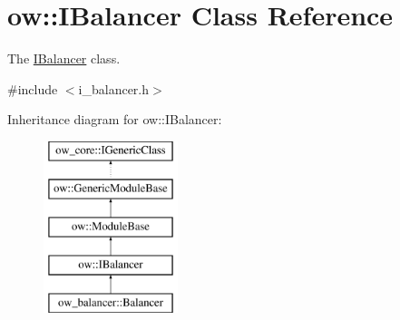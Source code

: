\hypertarget{classow_1_1IBalancer}{}\section{ow\+:\+:I\+Balancer Class Reference}
\label{classow_1_1IBalancer}


The \hyperlink{classow_1_1IBalancer}{I\+Balancer} class.  




{\ttfamily \#include $<$i\+\_\+balancer.\+h$>$}

Inheritance diagram for ow\+:\+:I\+Balancer\+:\begin{figure}[H]
\begin{center}
\leavevmode
\includegraphics[height=5.000000cm]{d7/da1/classow_1_1IBalancer}
\end{center}
\end{figure}
